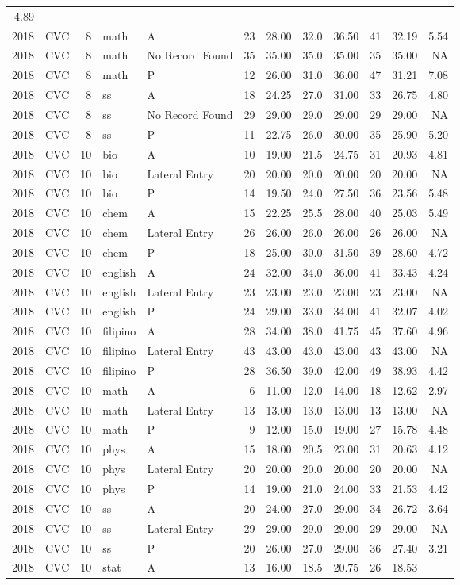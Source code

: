 \documentclass[]{article}
\begin{document}
\begin{longtable}[]{@{}rlrllrrrrrrr@{}}
4.89\tabularnewline
2018 & CVC & 8 & math & A & 23 & 28.00 & 32.0 & 36.50 & 41 & 32.19 &
5.54\tabularnewline
2018 & CVC & 8 & math & No Record Found & 35 & 35.00 & 35.0 & 35.00 & 35
& 35.00 & NA\tabularnewline
2018 & CVC & 8 & math & P & 12 & 26.00 & 31.0 & 36.00 & 47 & 31.21 &
7.08\tabularnewline
2018 & CVC & 8 & ss & A & 18 & 24.25 & 27.0 & 31.00 & 33 & 26.75 &
4.80\tabularnewline
2018 & CVC & 8 & ss & No Record Found & 29 & 29.00 & 29.0 & 29.00 & 29 &
29.00 & NA\tabularnewline
2018 & CVC & 8 & ss & P & 11 & 22.75 & 26.0 & 30.00 & 35 & 25.90 &
5.20\tabularnewline
2018 & CVC & 10 & bio & A & 10 & 19.00 & 21.5 & 24.75 & 31 & 20.93 &
4.81\tabularnewline
2018 & CVC & 10 & bio & Lateral Entry & 20 & 20.00 & 20.0 & 20.00 & 20 &
20.00 & NA\tabularnewline
2018 & CVC & 10 & bio & P & 14 & 19.50 & 24.0 & 27.50 & 36 & 23.56 &
5.48\tabularnewline
2018 & CVC & 10 & chem & A & 15 & 22.25 & 25.5 & 28.00 & 40 & 25.03 &
5.49\tabularnewline
2018 & CVC & 10 & chem & Lateral Entry & 26 & 26.00 & 26.0 & 26.00 & 26
& 26.00 & NA\tabularnewline
2018 & CVC & 10 & chem & P & 18 & 25.00 & 30.0 & 31.50 & 39 & 28.60 &
4.72\tabularnewline
2018 & CVC & 10 & english & A & 24 & 32.00 & 34.0 & 36.00 & 41 & 33.43 &
4.24\tabularnewline
2018 & CVC & 10 & english & Lateral Entry & 23 & 23.00 & 23.0 & 23.00 &
23 & 23.00 & NA\tabularnewline
2018 & CVC & 10 & english & P & 24 & 29.00 & 33.0 & 34.00 & 41 & 32.07 &
4.02\tabularnewline
2018 & CVC & 10 & filipino & A & 28 & 34.00 & 38.0 & 41.75 & 45 & 37.60
& 4.96\tabularnewline
2018 & CVC & 10 & filipino & Lateral Entry & 43 & 43.00 & 43.0 & 43.00 &
43 & 43.00 & NA\tabularnewline
2018 & CVC & 10 & filipino & P & 28 & 36.50 & 39.0 & 42.00 & 49 & 38.93
& 4.42\tabularnewline
2018 & CVC & 10 & math & A & 6 & 11.00 & 12.0 & 14.00 & 18 & 12.62 &
2.97\tabularnewline
2018 & CVC & 10 & math & Lateral Entry & 13 & 13.00 & 13.0 & 13.00 & 13
& 13.00 & NA\tabularnewline
2018 & CVC & 10 & math & P & 9 & 12.00 & 15.0 & 19.00 & 27 & 15.78 &
4.48\tabularnewline
2018 & CVC & 10 & phys & A & 15 & 18.00 & 20.5 & 23.00 & 31 & 20.63 &
4.12\tabularnewline
2018 & CVC & 10 & phys & Lateral Entry & 20 & 20.00 & 20.0 & 20.00 & 20
& 20.00 & NA\tabularnewline
2018 & CVC & 10 & phys & P & 14 & 19.00 & 21.0 & 24.00 & 33 & 21.53 &
4.42\tabularnewline
2018 & CVC & 10 & ss & A & 20 & 24.00 & 27.0 & 29.00 & 34 & 26.72 &
3.64\tabularnewline
2018 & CVC & 10 & ss & Lateral Entry & 29 & 29.00 & 29.0 & 29.00 & 29 &
29.00 & NA\tabularnewline
2018 & CVC & 10 & ss & P & 20 & 26.00 & 27.0 & 29.00 & 36 & 27.40 &
3.21\tabularnewline
2018 & CVC & 10 & stat & A & 13 & 16.00 & 18.5 & 20.75 & 26 & 18.53 &

\end{longtable}
\end{document}
